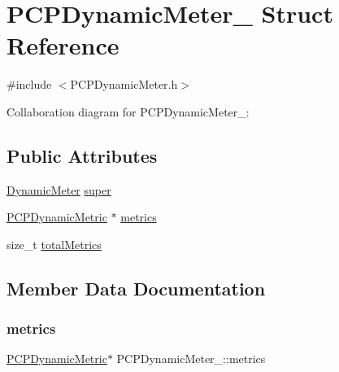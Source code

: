 \hypertarget{structPCPDynamicMeter__}{}\section{P\+C\+P\+Dynamic\+Meter\+\_\+ Struct Reference}
\label{structPCPDynamicMeter__}


{\ttfamily \#include $<$P\+C\+P\+Dynamic\+Meter.\+h$>$}



Collaboration diagram for P\+C\+P\+Dynamic\+Meter\+\_\+\+:
\subsection*{Public Attributes}
\begin{DoxyCompactItemize}
\item 
\hyperlink{DynamicMeter_8h_a4836428310d7591a9859c041b4ccef09}{Dynamic\+Meter} \hyperlink{structPCPDynamicMeter___afaa3401225b1d8ce7a265f96e8fb8396}{super}
\item 
\hyperlink{PCPDynamicMeter_8h_aee84a9c7faa482cdebe065f72a693136}{P\+C\+P\+Dynamic\+Metric} $\ast$ \hyperlink{structPCPDynamicMeter___ac5c863aa477a11e7b0db46a8f5022297}{metrics}
\item 
size\+\_\+t \hyperlink{structPCPDynamicMeter___a21051cc7a66bba7b9dcd80431e42dde8}{total\+Metrics}
\end{DoxyCompactItemize}


\subsection{Member Data Documentation}
\mbox{\label{structPCPDynamicMeter___ac5c863aa477a11e7b0db46a8f5022297}} 
\subsubsection{\texorpdfstring{metrics}{metrics}}
{\footnotesize\ttfamily \hyperlink{PCPDynamicMeter_8h_aee84a9c7faa482cdebe065f72a693136}{P\+C\+P\+Dynamic\+Metric}$\ast$ P\+C\+P\+Dynamic\+Meter\+\_\+\+::metrics}

\mbox{\label{structPCPDynamicMeter___afaa3401225b1d8ce7a265f96e8fb8396}} 

